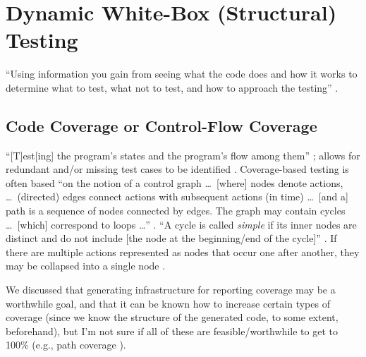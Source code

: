 \section[Dynamic White-Box (Structural) Testing]{Dynamic White-Box (Structural)
  Testing \citep[pp.~105-121]{Patton2006}}

``Using information you gain from seeing what the code does and how it works to
determine what to test, what not to test, and how to approach the testing''
\citep[p.~106]{Patton2006}.

\subsection[Code Coverage or Control-Flow Coverage]{Code Coverage
      \citep[pp.~117-121]{Patton2006} or Control-Flow Coverage
      \citep[pp.~421-424]{vanVliet2000}}

``[T]est[ing] the program's states and the program's flow among them''
\citep[p.~117]{Patton2006}; allows for redundant and/or missing test
cases to be identified \citep[p.~118]{Patton2006}. Coverage-based
testing is often based ``on the notion of a control graph \dots\ [where]
nodes denote actions, \dots\ (directed) edges connect actions with
subsequent actions (in time) \dots\ [and a] path is a sequence of nodes
connected by edges. The graph may contain cycles \dots\ [which] correspond
to loops \dots'' \citep[pp.~420-421]{vanVliet2000}. ``A cycle is
called \emph{simple} if its inner nodes are distinct and do not include
      [the node at the beginning/end of the cycle]''
\citep[p.~421,~emphasis added]{vanVliet2000}. If there are
multiple actions represented as nodes that occur one after another, they may
be collapsed into a single node \citep[p.~421]{vanVliet2000}.

We discussed that
generating infrastructure for reporting coverage may be a worthwhile goal, and
that it can be known how to increase certain types of coverage (since we know
the structure of the generated code, to some extent, beforehand), but I'm
not sure if all of these are feasible/worthwhile to get to 100\% (e.g., path
coverage \citep[p.~421]{vanVliet2000}).

